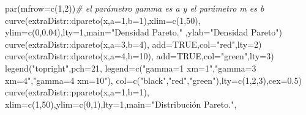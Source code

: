 \documentclass[
]{article}
\newenvironment{Shaded}{\begin{snugshade}}{\end{snugshade}}
\newcommand{\AttributeTok}[1]{\textcolor[rgb]{0.77,0.63,0.00}{#1}}
\newcommand{\CommentTok}[1]{\textcolor[rgb]{0.56,0.35,0.01}{\textit{#1}}}
\newcommand{\ConstantTok}[1]{\textcolor[rgb]{0.00,0.00,0.00}{#1}}
\newcommand{\DecValTok}[1]{\textcolor[rgb]{0.00,0.00,0.81}{#1}}
\newcommand{\FloatTok}[1]{\textcolor[rgb]{0.00,0.00,0.81}{#1}}
\newcommand{\FunctionTok}[1]{\textcolor[rgb]{0.00,0.00,0.00}{#1}}
\newcommand{\NormalTok}[1]{#1}
\newcommand{\SpecialCharTok}[1]{\textcolor[rgb]{0.00,0.00,0.00}{#1}}
\newcommand{\StringTok}[1]{\textcolor[rgb]{0.31,0.60,0.02}{#1}}
\begin{document}
\begin{Shaded}
\begin{Highlighting}[]
\FunctionTok{par}\NormalTok{(}\AttributeTok{mfrow=}\FunctionTok{c}\NormalTok{(}\DecValTok{1}\NormalTok{,}\DecValTok{2}\NormalTok{))}\CommentTok{\# el parámetro gamma es a y el parámetro m es b}
\FunctionTok{curve}\NormalTok{(extraDistr}\SpecialCharTok{::}\FunctionTok{dpareto}\NormalTok{(x,}\AttributeTok{a=}\DecValTok{1}\NormalTok{,}\AttributeTok{b=}\DecValTok{1}\NormalTok{),}\AttributeTok{xlim=}\FunctionTok{c}\NormalTok{(}\DecValTok{1}\NormalTok{,}\DecValTok{50}\NormalTok{),}
      \AttributeTok{ylim=}\FunctionTok{c}\NormalTok{(}\DecValTok{0}\NormalTok{,}\FloatTok{0.04}\NormalTok{),}\AttributeTok{lty=}\DecValTok{1}\NormalTok{,}\AttributeTok{main=}\StringTok{"Densidad  Pareto."}
\NormalTok{      ,}\AttributeTok{ylab=}\StringTok{"Densidad Pareto"}\NormalTok{)}
\FunctionTok{curve}\NormalTok{(extraDistr}\SpecialCharTok{::}\FunctionTok{dpareto}\NormalTok{(x,}\AttributeTok{a=}\DecValTok{3}\NormalTok{,}\AttributeTok{b=}\DecValTok{4}\NormalTok{),}
      \AttributeTok{add=}\ConstantTok{TRUE}\NormalTok{,}\AttributeTok{col=}\StringTok{"red"}\NormalTok{,}\AttributeTok{lty=}\DecValTok{2}\NormalTok{)}
\FunctionTok{curve}\NormalTok{(extraDistr}\SpecialCharTok{::}\FunctionTok{dpareto}\NormalTok{(x,}\AttributeTok{a=}\DecValTok{4}\NormalTok{,}\AttributeTok{b=}\DecValTok{10}\NormalTok{),}
      \AttributeTok{add=}\ConstantTok{TRUE}\NormalTok{,}\AttributeTok{col=}\StringTok{"green"}\NormalTok{,}\AttributeTok{lty=}\DecValTok{3}\NormalTok{)}
\FunctionTok{legend}\NormalTok{(}\StringTok{"topright"}\NormalTok{,}\AttributeTok{pch=}\DecValTok{21}\NormalTok{,}
       \AttributeTok{legend=}\FunctionTok{c}\NormalTok{(}\StringTok{"gamma=1 xm=1"}\NormalTok{,}\StringTok{"gamma=3 xm=4"}\NormalTok{,}\StringTok{"gamma=4 xm=10"}\NormalTok{),}
       \AttributeTok{col=}\FunctionTok{c}\NormalTok{(}\StringTok{"black"}\NormalTok{,}\StringTok{"red"}\NormalTok{,}\StringTok{"green"}\NormalTok{),}\AttributeTok{lty=}\FunctionTok{c}\NormalTok{(}\DecValTok{1}\NormalTok{,}\DecValTok{2}\NormalTok{,}\DecValTok{3}\NormalTok{),}\AttributeTok{cex=}\FloatTok{0.5}\NormalTok{)}
\FunctionTok{curve}\NormalTok{(extraDistr}\SpecialCharTok{::}\FunctionTok{ppareto}\NormalTok{(x,}\AttributeTok{a=}\DecValTok{1}\NormalTok{,}\AttributeTok{b=}\DecValTok{1}\NormalTok{),}
      \AttributeTok{xlim=}\FunctionTok{c}\NormalTok{(}\DecValTok{1}\NormalTok{,}\DecValTok{50}\NormalTok{),}\AttributeTok{ylim=}\FunctionTok{c}\NormalTok{(}\DecValTok{0}\NormalTok{,}\DecValTok{1}\NormalTok{),}\AttributeTok{lty=}\DecValTok{1}\NormalTok{,}\AttributeTok{main=}\StringTok{"Distribución  Pareto."}\NormalTok{,}

\end{Highlighting}
\end{Shaded}
\end{document}
